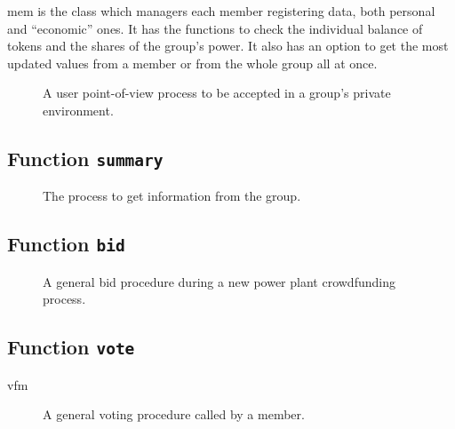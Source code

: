 \hline

\gls{mem} is the class which managers each member registering data, both personal and ``economic'' ones.
It has the functions to check the individual balance of tokens and the shares of the group's power.
It also has an option to get the most updated values from a member or from the whole group all at once.

\begin{figure}[h!tbp]{\textwidth}
    \centering
    \caption{A user point-of-view process to be accepted in a group's private environment.}
    \label{fig:flow-admision}
    \frame{\resizebox{\textwidth}{!}{}}
    \source{\copyright}
\end{figure}

\subsection*{Function \texttt{summary}}

\begin{figure}[h!tbp]{\textwidth}
    \centering
    \caption{The process to get information from the group.}
    \frame{\resizebox{0.5\textwidth}{!}{}}
    \source{\copyright}
\end{figure}

\subsection*{Function \texttt{bid}}

\begin{figure}[h!tbp]{\textwidth}
    \centering
    \caption{A general bid procedure during a new power plant crowdfunding process.}
    \frame{\resizebox{0.5\textwidth}{!}{}}
    \source{\copyright}
\end{figure}

\subsection*{Function \texttt{vote}}

\acrfull{vfm}

\begin{figure}[h!tbp]{\textwidth}
    \centering
    \caption{A general voting procedure called by a member.}
    \frame{\resizebox{0.5\textwidth}{!}{}}
    \source{\copyright}
\end{figure}


